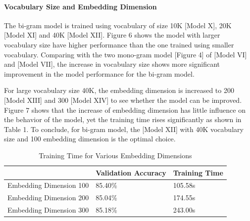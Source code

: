 \documentclass[10pt]{article}
\begin{document}
\paragraph{Vocabulary Size and Embedding Dimension}
The bi-gram model is trained using vocabulary of size 10K [Model X], 20K [Model XI] and 40K [Model XII]. Figure 6 shows the model with larger vocabulary size have higher performance than the one trained using smaller vocabulary. Comparing with the two mono-gram model [Figure 4] of [Model VI] and [Model VII], the increase in vocabulary size shows more significant improvement in the model performance for the bi-gram model.\par
For large vocabulary size 40K, the embedding dimension is increased to 200 [Model XIII] and 300 [Model XIV] to see whether the model can be improved. Figure 7 shows that the increase of embedding dimension has little influence on the behavior of the model, yet the training time rises significantly as shown in Table 1.  To conclude, for bi-gram model, the [Model XII] with 40K vocabulary size and 100 embedding dimension is the optimal choice.

\begin{table}[h]
\centering
\caption{Training Time for Various Embedding Dimensions}
\label{my-label}
\begin{tabular}{lll}
\hline
                        & Validation Accuracy & Training Time \\ \hline
Embedding Dimension 100 & 85.40\%             & 105.58s       \\
Embedding Dimension 200 & 85.04\%             & 174.55s       \\
Embedding Dimension 300 & 85.18\%             & 243.00s       \\ \hline
\end{tabular}
\end{table}
\end{document}
